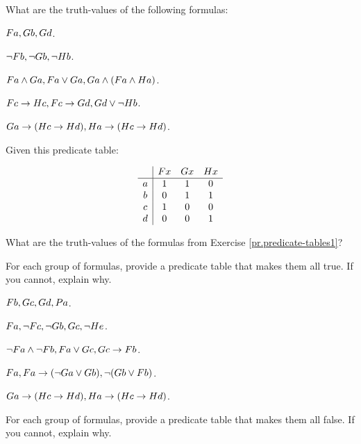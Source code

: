 \documentclass[PHIL101-Textbook.tex]{subfiles}
\begin{document}
\noindent What are the truth-values of the following formulas:

\begin{earg}
\item $\mathord{F}{a}, \mathord{G}{b},\mathord{G}{d}$.
  \item $\neg \mathord{F}{b}, \neg \mathord{G}{b}, \neg \mathord{H}{b}$.
  \item $\mathord{F}{a} \land \mathord{G}{a}, \mathord{F}{a} \vee \mathord{G}{a}, \mathord{G}{a} \land (\mathord{F}{a} \land Ha)$.
  \item $\mathord{F}{c} \rightarrow \mathord{H}{c}, \mathord{F}{c} \rightarrow \mathord{G}{d}, \mathord{G}{d} \vee \neg \mathord{H}{b}$.
	\item $\mathord{G}{a} \rightarrow (\mathord{H}{c} \rightarrow \mathord{H}{d}), \mathord{H}{a} \rightarrow (\mathord{H}{c} \rightarrow \mathord{H}{d})$.
\end{earg}


\noindent\problempart \label{pr.predicate-tables2}
Given this predicate table:

\[\begin{array}{c|ccc}
		&\mathord{F}{x}& \mathord{G}{x}& \mathord{H}{x}\\ \hline
	  a & 1 & 1 & 0\\
	  b & 0 & 1 & 1\\
	  c & 1 & 0 & 0\\
	  d & 0 & 0 & 1
	\end{array}\]

\noindent What are the truth-values of the formulas from Exercise \ref{pr.predicate-tables1}?
\medskip


\noindent \problempart \label{pr.predicate-tables-backward-true}
For each group of formulas, provide a predicate table that makes them all true. If you cannot, explain why. 

\begin{earg}
\item $\mathord{F}{b}, \mathord{G}{c}, \mathord{G}{d}, \mathord{P}{a}$.
  \item $\mathord{F}{a}, \neg \mathord{F}{c}, \neg \mathord{G}{b}, \mathord{G}{c}, \neg \mathord{H}{e}$.
  \item $\neg \mathord{F}{a} \land \neg \mathord{F}{b}, \mathord{F}{a} \vee \mathord{G}{c}, \mathord{G}{c} \rightarrow \mathord{F}{b}$.
  \item $\mathord{F}{a}, \mathord{F}{a}\rightarrow (\neg \mathord{G}{a} \vee \mathord{G}{b}), \neg (\mathord{G}{b} \vee \mathord{F}{b})$.
	\item $\mathord{G}{a} \rightarrow (\mathord{H}{c} \rightarrow \mathord{H}{d}), \mathord{H}{a} \rightarrow (\mathord{H}{c} \rightarrow \mathord{H}{d})$.
\end{earg}

\noindent \problempart \label{pr.predicate-tables-backward-false}
For each group of formulas, provide a predicate table that makes them all false. If you cannot, explain why. 
 
\end{document}
